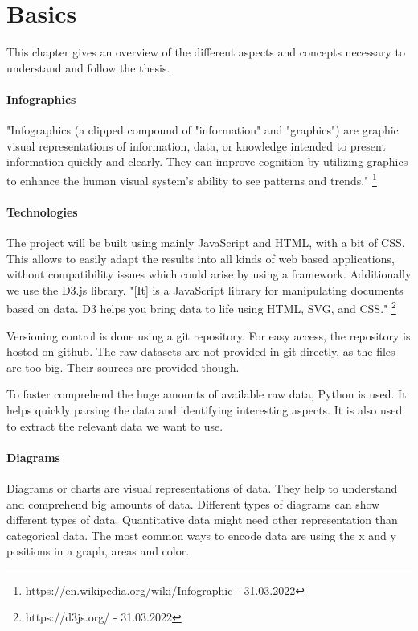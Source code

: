 \documentclass[
a4paper,     %
12pt         %
]{scrartcl}  %
\begin{document}
\section{Basics}
This chapter gives an overview of the different aspects and concepts necessary to understand and follow the thesis.

\paragraph{Infographics}
"Infographics (a clipped compound of "information" and "graphics") are graphic visual representations of information, data, or knowledge intended to present information quickly and clearly. They can improve cognition by utilizing graphics to enhance the human visual system's ability to see patterns and trends." \footnote{https://en.wikipedia.org/wiki/Infographic - 31.03.2022}

\paragraph{Technologies}
The project will be built using mainly JavaScript and HTML, with a bit of CSS. This allows to easily adapt the results into all kinds of web based applications, without compatibility issues which could arise by using a framework. Additionally we use the D3.js library. "[It] is a JavaScript library for manipulating documents based on data. D3 helps you bring data to life using HTML, SVG, and CSS." \footnote{https://d3js.org/ - 31.03.2022}

Versioning control is done using a git repository. For easy access, the repository is hosted on github. The raw datasets are not provided in git directly, as the files are too big. Their sources are provided though.

To faster comprehend the huge amounts of available raw data, Python is used. It helps quickly parsing the data and identifying interesting aspects. It is also used to extract the relevant data we want to use.

\paragraph{Diagrams}
Diagrams or charts are visual representations of data. They help to understand and comprehend big amounts of data. Different types of diagrams can show different types of data. Quantitative data might need other representation than categorical data. The most common ways to encode data are using the x and y positions in a graph, areas and color.
\end{document}
